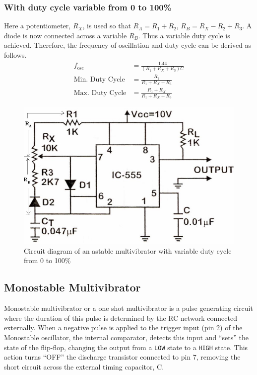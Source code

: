 \subsubsection{With duty cycle variable from 0 to 100\%}
Here a potentiometer, $R_X$, is
used so that $R_A = R_1+R_2$, $R_B = R_X-R_2+R_3$. A diode is now connected across a variable $R_B$.
Thus a variable duty cycle is achieved. Therefore, the frequency of oscillation and duty
cycle can be derived as follows.
\begin{align}
    f_\text{osc} &= \frac{1.44}{(R_1+R_X+R_3)C}\\
    \text{Min. Duty Cycle} &= \frac{R_1}{R_1+R_X+R_3}\\
    \text{Max. Duty Cycle} &= \frac{R_1+R_X}{R_1+R_X+R_3}
\end{align}

\begin{figure}[H]
    \centering
    \includegraphics[width=0.7\columnwidth]{images/ast4.png}
    \caption{Circuit diagram of an astable multivibrator with variable duty cycle from 0 to 100\%}
    \label{ast4}
\end{figure}

\subsection{Monostable Multivibrator}

Monostable multivibrator or a one shot multivibrator is a pulse generating
circuit where the duration of this pulse is determined by the RC network connected
externally. When a negative pulse is applied to the trigger input (pin 2) of the Monostable oscillator, the internal comparator, detects this input and “sets” the state of the flip-flop, changing the output from a \verb|LOW| state to a \verb|HIGH| state. This action turns “OFF” the discharge transistor connected to pin 7, removing the short circuit across the external timing capacitor, C.

